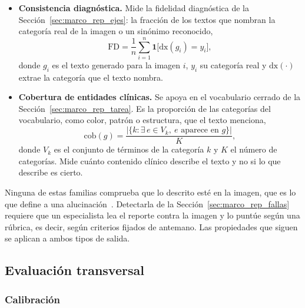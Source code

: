 \begin{itemize}
    \item \textbf{Consistencia diagnóstica.} Mide la fidelidad diagnóstica de la
    Sección~\ref{sec:marco_rep_ejes}: la fracción de los textos que nombran la categoría real de la imagen o un
    sinónimo reconocido,
    \begin{equation}
        \mathrm{FD} = \frac{1}{n}\sum_{i=1}^{n} \mathbf{1}\bigl[\mathrm{dx}(g_i) = y_i\bigr],
        \label{eq:marco_fd}
    \end{equation}
    donde $g_i$ es el texto generado para la imagen $i$, $y_i$ su categoría real y $\mathrm{dx}(\cdot)$ extrae la
    categoría que el texto nombra.

    \item \textbf{Cobertura de entidades clínicas.} Se apoya en el vocabulario cerrado de la
    Sección~\ref{sec:marco_rep_tarea}. Es la proporción de las categorías del vocabulario, como color, patrón o
    estructura, que el texto menciona,
    \begin{equation}
        \mathrm{cob}(g) = \frac{\bigl|\{k : \exists\, e \in V_k,\ e \text{ aparece en } g\}\bigr|}{K},
        \label{eq:marco_cobertura_ent}
    \end{equation}
    donde $V_k$ es el conjunto de términos de la categoría $k$ y $K$ el número de categorías. Mide cuánto
    contenido clínico describe el texto y no si lo que describe es cierto.
\end{itemize}

Ninguna de estas familias comprueba que lo descrito esté en la imagen, que es lo que define a una
alucinación~\cite{hartsock2024vision}. Detectarla de la Sección~\ref{sec:marco_rep_fallas} requiere que un especialista lea el reporte contra la
imagen y lo puntúe según una rúbrica, es decir, según criterios fijados de antemano. Las propiedades que
siguen se aplican a ambos tipos de salida.

\subsection{Evaluación transversal}
\label{sec:marco_eval_transversal}

\setcounter{secnumdepth}{3}
\subsubsection{Calibración}
\label{sec:marco_eval_calib}

